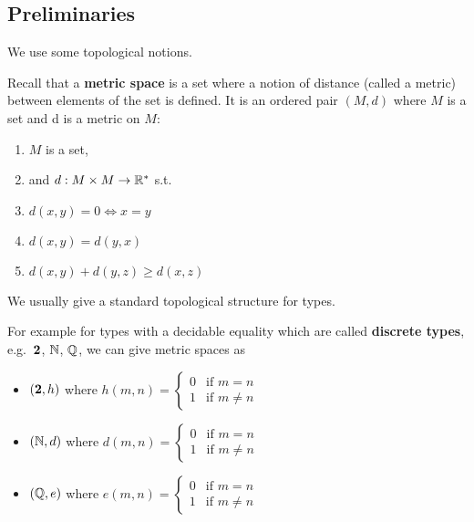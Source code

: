 
\subsection{Preliminaries}


We use some topological notions. 

Recall that a \textbf{metric space} is a set where a notion of distance (called a metric) between elements of the set is defined. It is an ordered pair $(M , d)$ where $M$ is a set and d is a metric on $M$:
\begin{enumerate}
\item $M$ is a set,
\item and $d : M \times M \rightarrow \mathbb{R}^*$ s.t.
\item $d (x , y) = 0 \iff x = y$
\item $d(x,y)=d(y,x)$
\item $d(x,y)+d(y,z) \ge d(x,z)$ 
\end{enumerate}

We usually give a standard topological structure for types. 

For example for types with a decidable equality which are called \textbf{discrete types}, e.g.\ $\mathbf{2}$, $\mathbb{N}$, $\mathbb{Q}$, we can give metric spaces as

\begin{itemize}
\item $(\mathbf{2} , h)$ where 
$h(m,n) =
\left\{
  \begin{array}{ll}
    0  & \mbox{if } m = n \\
    1 & \mbox{if } m \neq n
  \end{array}
\right.
$

\item $(\mathbb{N} , d)$ where 
$d(m,n) =
\left\{
  \begin{array}{ll}
    0  & \mbox{if } m = n \\
    1 & \mbox{if } m \neq n
  \end{array}
\right.
$

\item $(\mathbb{Q} , e)$ where 
$e(m,n) =
\left\{
  \begin{array}{ll}
    0  & \mbox{if } m = n \\
    1 & \mbox{if } m \neq n
  \end{array}
\right.
$
\end{itemize}

